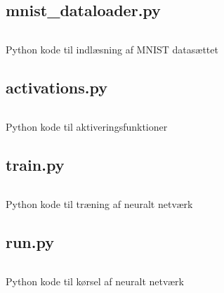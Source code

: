\documentclass{article}
\newenvironment{code}{\captionsetup{type=listing}}{}
\begin{document}
\subsection*{mnist\_dataloader.py}
\begin{code}
  \inputminted{python}{mnist_dataloader.py}
  \caption{Python kode til indlæsning af MNIST datasættet}
  \label{lst:mnist_dataloader}
\end{code}
\newpage

\subsection*{activations.py}
\begin{code}
  \inputminted{python}{activations.py}
  \caption{Python kode til aktiveringsfunktioner}
  \label{lst:activations}
\end{code}
\newpage

\subsection*{train.py}
\begin{code}
  \inputminted{python}{train.py}
  \caption{Python kode til træning af neuralt netværk}
  \label{lst:train}
\end{code}
\newpage

\subsection*{run.py}
\begin{code}
  \inputminted{python}{run.py}
  \caption{Python kode til kørsel af neuralt netværk}
  \label{lst:run}
\end{code}
\end{document}
